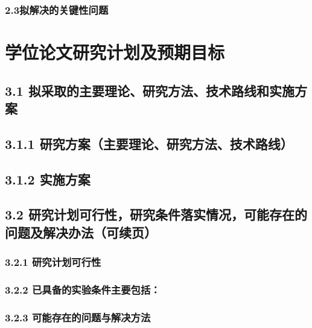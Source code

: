 \documentclass[12pt]{article}
\begin{document}
\subsubsection*{2.3拟解决的关键性问题}



\newpage
\section{学位论文研究计划及预期目标}
\subsection*{3.1 拟采取的主要理论、研究方法、技术路线和实施方案}

\subsection*{3.1.1 研究方案（主要理论、研究方法、技术路线）}

\subsection*{3.1.2 实施方案}


\newpage
\subsection*{3.2 研究计划可行性，研究条件落实情况，可能存在的问题及解决办法（可续页）}

\subsubsection*{3.2.1 研究计划可行性}



\subsubsection*{3.2.2 已具备的实验条件主要包括：}



\subsubsection*{3.2.3 可能存在的问题与解决方法}
\end{document}
